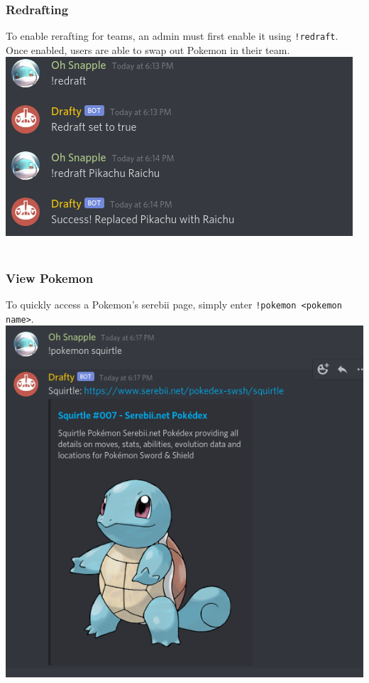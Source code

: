 \documentclass{article}
\begin{document}
\subsubsection*{Redrafting}
To enable rerafting for teams, an admin must first enable it using \verb|!redraft|. 
Once enabled, users are able to swap out Pokemon in their team.\\
\includegraphics[scale=.5]{redraft.png}
\\\\
\subsubsection*{View Pokemon}
To quickly access a Pokemon's serebii page, simply enter \verb|!pokemon <pokemon name>|.\\
\includegraphics[scale=.5]{pokemon.png}
\\\\
\end{document}
